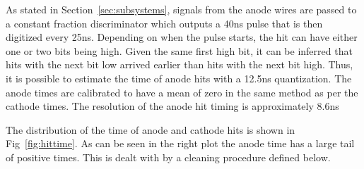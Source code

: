 As stated in Section~\ref{sec:subsystems}, signals from the anode wires are passed to a constant fraction discriminator which outputs a 40ns pulse
that is then digitized every 25ns. Depending on when the pulse starts, the hit can have either one or two bits being high. Given the same
first high bit, it can be inferred that hits with the next bit low arrived earlier than hits with the next bit high.
Thus, it is possible to estimate the time of anode hits with a 12.5ns quantization. The anode times are calibrated to have a mean of zero in the same method as
per the cathode times. The resolution of the anode hit timing is approximately 8.6ns 

The distribution of the time of anode and cathode hits is shown in Fig~\ref{fig:hittime}. As can be seen in the right plot the anode time has a large tail of
positive times. This is dealt with by a cleaning procedure defined below.

